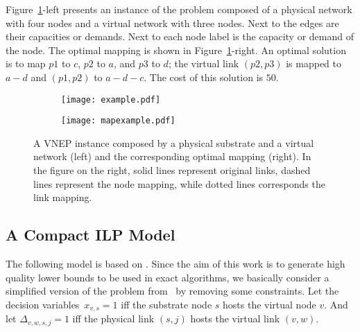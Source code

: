\documentclass[article]{llncs}
\begin{document}
Figure~\ref{fig:example}-left presents an instance of the problem composed of a physical network with four nodes and a virtual network with three nodes. Next to the edges are their capacities or demands. Next to each node label is the capacity or demand of the node.
The optimal mapping is shown in Figure~\ref{fig:example}-right. 
An optimal solution is to map $p1$ to $c$, $p2$ to $a$, and $p3$ to $d$;
the virtual link $(p2,p3)$ is mapped to $a-d$ and $(p1,p2)$ to $a-d-c$. The cost of this solution is $50$.

\begin{figure}
  \centering
  \begin{subfigure}[b]{0.45\textwidth}
    \centering
    \texttt{[image: example.pdf]}
  \end{subfigure}\quad
  \begin{subfigure}[b]{0.45\textwidth}
    \centering
    \texttt{[image: mapexample.pdf]}
  \end{subfigure}
  \caption{A VNEP instance composed by a physical substrate and a virtual network (left) and the corresponding optimal mapping (right).
In the figure on the right, solid lines represent original links, dashed lines represent the node mapping, while dotted lines corresponds the link mapping.
\label{fig:example}}
\end{figure}






\subsection{A Compact ILP Model}
\label{sec:ILPmodel}
The following model is based on \cite{Alkmim2013}. Since the aim of this work is to generate high quality lower bounds to be used in exact algorithms, we basically consider a simplified version of the problem from~\cite{Alkmim2013} by removing some constraints.
Let the decision variables~$x_{v,s} = 1$ iff the substrate node $s$ hosts the virtual node $v$. And let $\Delta_{v,w,s,j} = 1$ iff the physical link $(s,j)$ hosts the virtual link $(v,w)$.
\end{document}
